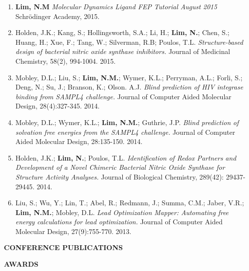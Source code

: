 {\begin{enumerate}
    \item \textbf{Lim, N.M} 
        \textit{Molecular Dynamics Ligand FEP Tutorial August 2015}
        Schrödinger Academy, 2015.
    \item Holden, J.K.; Kang, S.; Hollingsworth, S.A.; Li, H.; \textbf{Lim, N.}; Chen, S.; Huang, H.; Xue, F.; Tang, W.; Silverman, R.B; Poulos, T.L.
        \textit{Structure-based design of bacterial nitric oxide synthase inhibitors.}
        Journal of Medicinal Chemistry, 58(2), 994-1004. 2015.
    \item Mobley, D.L.; Liu, S.; \textbf{Lim, N.M.}; Wymer, K.L.; Perryman, A.L.; Forli, S.; Deng, N.; Su, J.; Branson, K.; Olson. A.J.
        \textit{Blind prediction of HIV integrase binding from SAMPL4 challenge.}
        Journal of Computer Aided Molecular Design, 28(4):327-345. 2014.
    \item Mobley, D.L.; Wymer, K.L.; \textbf{Lim, N.M.}; Guthrie, J.P.
        \textit{Blind prediction of solvation free energies from the SAMPL4 challenge.}
        Journal of Computer Aided Molecular Design, 28:135-150. 2014.
    \item Holden, J.K.; \textbf{Lim, N.}; Poulos, T.L.
        \textit{Identification of Redox Partners and Development of a Novel Chimeric Bacterial Nitric Oxide Synthase for Structure Activity Analyses.}
        Journal of Biological Chemistry, 289(42): 29437-29445. 2014.
    \item Liu, S.; Wu, Y.; Lin, T.; Abel, R.; Redmann, J.; Summa, C.M.; Jaber, V.R.; \textbf{Lim, N.M.}; Mobley, D.L.
        \textit{Lead Optimization Mapper: Automating free energy calculations for lead optimization.}
        Journal of Computer Aided Molecular Design, 27(9):755-770. 2013. 
\end{enumerate}

\vspace{12pt}
\textbf{CONFERENCE PUBLICATIONS}

  
\vspace{12pt}
\textbf{AWARDS}

}
